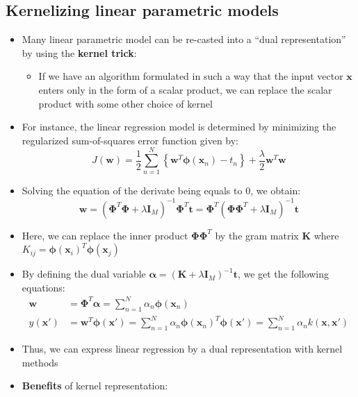 \subsection{Kernelizing linear parametric models}
\begin{itemize}
	\item Many linear parametric model can be re-casted into a ``dual representation'' by using the \textbf{kernel trick}: 
	\begin{itemize}
		\item If we have an algorithm formulated in such a way that the input vector $\bm{x}$ enters only in the form of a scalar product, we can replace the scalar product with some other choice of kernel
	\end{itemize}
	\item For instance, the linear regression model is determined by minimizing the regularized sum-of-squares error function given by:
	$$J(\bm{w}) = \frac{1}{2}\sum\limits_{n=1}^{N} \left\{\bm{w}^T \bm{\phi}\left(\bm{x}_n\right) - t_n \right\} + \frac{\lambda}{2}\bm{w}^T \bm{w}$$
	\item Solving the equation of the derivate being equals to 0, we obtain:
	$$\bm{w} = \left(\bm{\Phi}^T\bm{\Phi} +\lambda \bm{I}_M\right)^{-1}\bm{\Phi}^T\bm{t} = \bm{\Phi}^T\left(\bm{\Phi}\bm{\Phi}^T +\lambda \bm{I}_M\right)^{-1}\bm{t} $$
	\item Here, we can replace the inner product $\bm{\Phi}\bm{\Phi}^T$ by the gram matrix $\bm{K}$ where $K_{ij} = \bm{\phi}(\bm{x}_i)^T\bm{\phi}(\bm{x}_j)$
	\item By defining the dual variable $\bm{\alpha} = \left(\bm{K} +\lambda \bm{I}_M\right)^{-1}\bm{t}$, we get the following equations:
	\begin{equation*}
		\begin{split}
			\bm{w} & =\bm{\Phi}^T \bm{\alpha} = \sum\limits_{n=1}^{N} \alpha_n \bm{\phi}(\bm{x}_n)\\
			y\left(\bm{x}'\right) & = \bm{w}^T \bm{\phi}(\bm{x}') = \sum\limits_{n=1}^{N} \alpha_n \bm{\phi}\left(\bm{x}_n\right)^T \bm{\phi}\left(\bm{x}'\right) = \sum\limits_{n=1}^{N} \alpha_n k\left(\bm{x},\bm{x}'\right)
		\end{split}
	\end{equation*}
	\item Thus, we can express linear regression by a dual representation with kernel methods
	\item \textbf{Benefits} of kernel representation:
	\begin{itemize}

\end{itemize}
\end{itemize}

